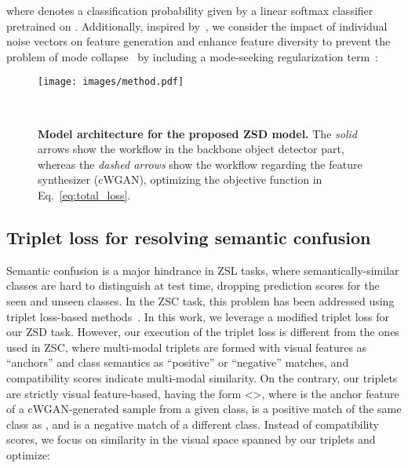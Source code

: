 \documentclass{bmvc2k}
\begin{document}
where  denotes a classification probability given by a linear softmax classifier  pretrained on . Additionally, inspired by~\cite{hayat2020synthesizing}, we consider the impact of individual noise vectors on feature generation and enhance feature diversity to prevent the problem of mode collapse~\cite{salimans2016improved} by including a mode-seeking regularization term~\cite{mao2019mode}:





\begin{figure}[t]
	\centering
	\texttt{[image: images/method.pdf]}
	\caption{{\bf Model architecture for the proposed ZSD model.} The {\em solid} arrows show the workflow in the backbone object detector part, whereas the {\em dashed arrows} show the workflow regarding the feature synthesizer (cWGAN), optimizing the objective function in Eq.~\ref{eq:total_loss}.}  \
	\label{fig:zsd-model}
	
\end{figure} 

\subsection{Triplet loss for resolving semantic confusion}
\label{sec:sem-confusion}


Semantic confusion is a major hindrance in ZSL tasks, where semantically-similar classes are hard to distinguish at test time, dropping prediction scores for the seen and unseen classes. In the ZSC task, this problem has been addressed using triplet loss-based methods~\cite{akata2015label, frome2013devise}. In this work, we leverage a modified triplet loss for our ZSD task. However, our execution of the triplet loss is different from the ones used in ZSC, where multi-modal triplets are formed with visual features as ``anchors'' and class semantics as ``positive'' or ``negative'' matches, and compatibility scores indicate multi-modal similarity. On the contrary, our triplets are strictly visual feature-based, having the form <>, where  is the anchor feature of a cWGAN-generated sample from a given class,  is a positive match of the same class as , and  is a negative match of a different class. Instead of compatibility scores, we focus on similarity in the visual space spanned by our triplets and optimize:
\end{document}
